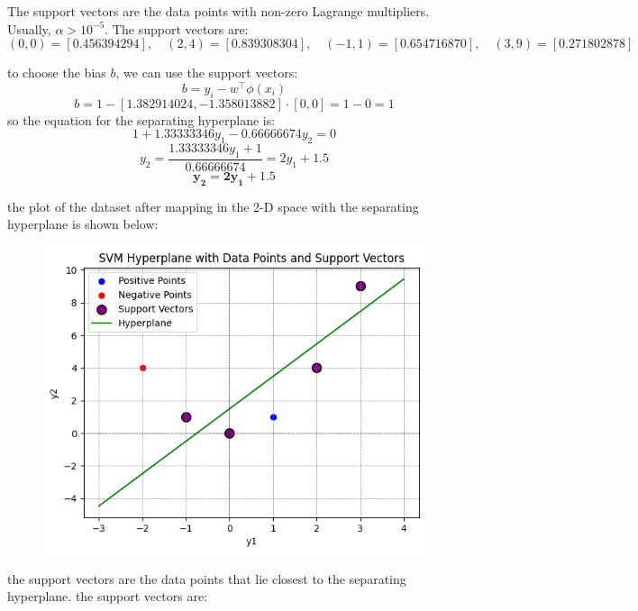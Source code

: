 \documentclass[a3paper,12pt]{article} %
\begin{document}
\begin{enumerate}
The support vectors are the data points with non-zero Lagrange multipliers. Usually, \(\alpha > 10^{-5}\). The support vectors are:
\[
(0,0) = [0.456394294], \quad (2,4) = [0.839308304], \quad (-1,1) = [0.654716870], \quad (3,9) = [0.271802878]
\]

to choose the bias \(b\), we can use the support vectors:
\[
b = y_i - w^\top \phi(x_i)
\]
\[
b = 1 - [1.382914024, -1.358013882] \cdot [0, 0] = 1 - 0 = 1
\]
so the equation for the separating hyperplane is:
\[
1 + 1.33333346y_1 - 0.66666674y_2 = 0
\]
\[
y_2 = \frac{1.33333346y_1 + 1}{0.66666674} = 2y_1 + 1.5
\]
\[
\mathbf{y_2 = 2y_1 + 1.5}
\]

the plot of the dataset after mapping in the 2-D space with the separating hyperplane is shown below:
    \begin{figure}[h!]
        \centering
        \includegraphics[width=0.5\linewidth]{HYPERLANE.png}
    \label{fig:separating hyperplane}
    \end{figure}
    the support vectors are the data points that lie closest to the separating hyperplane. the support vectors are:
\end{enumerate}
\end{document}
